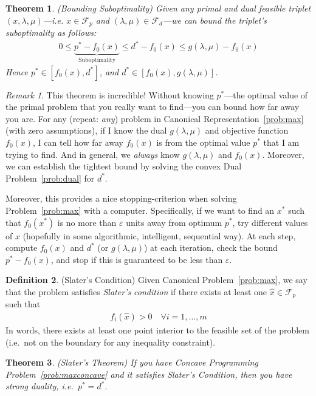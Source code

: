 \documentclass[12pt]{article}
\numberwithin{equation}{section} %
\theoremstyle{plain}
\newtheorem{thm}{Theorem}[section]
\theoremstyle{definition}
\newtheorem{defn}[thm]{Definition}
\theoremstyle{remark}
\newtheorem*{rmk}{Remark}
\begin{document}
\begin{thm}{\emph{(Bounding Suboptimality)}}
Given \emph{any} primal and dual feasible triplet
$(x,\lambda,\mu)$---i.e. $x\in\mathscr{F}_p$ and
$(\lambda,\mu)\in\mathscr{F}_d$---we can bound the triplet's
suboptimality as follows:
\begin{align*}
  0 \leq \underbrace{p^* - f_0(x)}_{\text{Suboptimality}}
  \leq d^* - f_0(x)
  \leq g(\lambda,\mu) - f_0(x)
\end{align*}
Hence $p^*\in [f_0(x), d^*]$, and $d^*\in[f_0(x),g(\lambda,\mu)]$.
\end{thm}
\begin{rmk}
This theorem is incredible! Without knowing $p^*$---the optimal value of
the primal problem that you really want to find---you can bound how far
away you are. For any (repeat: \emph{any}) problem in Canonical
Representation~\ref{prob:max} (with zero assumptions), if I know the
dual $g(\lambda,\mu)$ and objective function $f_0(x)$, I can tell how
far away $f_0(x)$ is from the optimal value $p^*$ that I am trying to
find. And in general, we \emph{always} know $g(\lambda,\mu)$ and
$f_0(x)$. Moreover, we can establish the tightest bound by solving the
convex Dual Problem~\ref{prob:dual} for $d^*$.

Moreover, this provides a nice stopping-criterion when solving
Problem~\ref{prob:max} with a computer. Specifically, if we want to find
an $x^*$ such that $f_0(x^*)$ is
no more than $\varepsilon$ units away from  optimum $p^*$, try different
values of $x$ (hopefully in some algorithmic, intelligent, sequential
way). At each step, compute $f_0(x)$ and $d^*$ (or $g(\lambda,\mu)$) at
each iteration, check the bound $p^*-f_0(x)$, and stop if this is
guaranteed to be less than $\varepsilon$.
\end{rmk}

\begin{defn}{(Slater's Condition)}
Given Canonical Problem~\ref{prob:max}, we say that the problem
satisfies \emph{Slater's condition} if there exists at least one
$\hat{x}\in\mathscr{F}_p$ such that
\begin{align*}
  f_i(\hat{x})>0
  \quad \forall i=1,\ldots,m
\end{align*}
In words, there exists at least one point interior to the feasible set
of the problem (i.e.\ not on the boundary for any inequality
constraint).
\end{defn}

\begin{thm}{\emph{(Slater's Theorem)}}
If you have Concave Programming Problem~\ref{prob:maxconcave} and it
satisfies Slater's Condition, then you have strong duality, i.e.\
$p^*=d^*$.
\end{thm}
\end{document}
